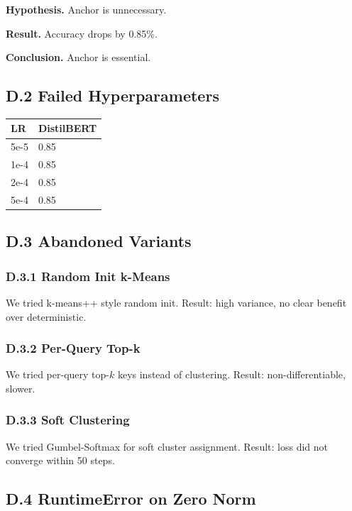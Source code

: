 \textbf{Hypothesis.} Anchor is unnecessary.

\textbf{Result.} Accuracy drops by 0.85\%.

\textbf{Conclusion.} Anchor is essential.

\subsection{D.2 Failed Hyperparameters}

\begin{table}[H]
\centering
\small
\begin{tabular}{ll}
\toprule
\textbf{LR} & \textbf{DistilBERT} \\
\midrule
5e-5 & 0.85 \\
1e-4 & 0.85 \\
2e-4 & 0.85 \\
5e-4 & 0.85 \\
\bottomrule
\end{tabular}
\end{table}

\subsection{D.3 Abandoned Variants}

\subsubsection{D.3.1 Random Init k-Means}

We tried k-means++ style random init. Result: high variance, no clear 
benefit over deterministic.

\subsubsection{D.3.2 Per-Query Top-k}

We tried per-query top-$k$ keys instead of clustering. Result: non-differentiable, 
slower.

\subsubsection{D.3.3 Soft Clustering}

We tried Gumbel-Softmax for soft cluster assignment. Result: loss did not 
converge within 50 steps.

\subsection{D.4 RuntimeError on Zero Norm}

